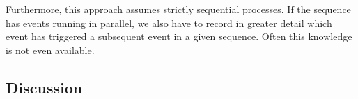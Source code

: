 \documentclass[./../../paper.tex]{subfiles}
\begin{document}
Furthermore, this approach assumes strictly sequential processes. If the sequence has events running in parallel, we also have to record in greater detail which event has triggered a subsequent event in a given sequence. Often this knowledge is not even available.  


\subsection{Discussion}
 
\end{document}
